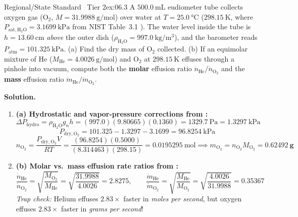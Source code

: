 \begin{workedexample}{Regional/State Standard \textbar\ Tier 2}{ex:06.3}
A $\SI{500.0}{\milli\liter}$ eudiometer tube collects oxygen gas ($\mathrm{O_2}$, $M = \SI{31.9988}{\gram\per\mole}$) over water at $T = \SI{25.0}{\celsius}$ ($\SI{298.15}{\kelvin}$, where $P_{\mathrm{sat,H_2O}} = \SI{3.1699}{\kilo\pascal}$ from NIST Table~3.1 ). The water level inside the tube is $h = \SI{13.60}{\centi\meter}$ \emph{above} the outer dish ($\rho_{\mathrm{H_2O}} = \SI{997.0}{\kilogram\per\cubic\meter}$), and the barometer reads $P_{\mathrm{atm}} = \SI{101.325}{\kilo\pascal}$. (a) Find the dry mass of $\mathrm{O_2}$ collected. (b) If an equimolar mixture of $\mathrm{He}$ ($M_{\mathrm{He}} = \SI{4.0026}{\gram\per\mole}$) and $\mathrm{O_2}$ at $\SI{298.15}{\kelvin}$ effuses through a pinhole into vacuum, compute both the \textbf{molar} effusion ratio $\dot{n}_{\mathrm{He}}/\dot{n}_{\mathrm{O_2}}$ and the \textbf{mass} effusion ratio $\dot{m}_{\mathrm{He}}/\dot{m}_{\mathrm{O_2}}$.
\par\smallskip\noindent
\textbf{Solution.}
\begin{enumerate}
  \item \textbf{(a) Hydrostatic and vapor-pressure corrections from :}
  \[
    \Delta P_{\mathrm{hydro}} = \rho_{\mathrm{H_2O}}g_n h = (997.0)(9.80665)(0.1360) = \SI{1329.7}{\pascal} = \SI{1.3297}{\kilo\pascal}
  \]
  \[
    P_{\mathrm{dry,O_2}} = 101.325 - 1.3297 - 3.1699 = \SI{96.8254}{\kilo\pascal}
  \]
  \[
    n_{\mathrm{O_2}} = \frac{P_{\mathrm{dry,O_2}}V}{RT} = \frac{(96.8254)(0.5000)}{(8.314463)(298.15)} = \SI{0.0195295}{\mole} \implies m_{\mathrm{O_2}} = n_{\mathrm{O_2}}M_{\mathrm{O_2}} = \mathbf{\SI{0.62492}{\gram}}
  \]
  \item \textbf{(b) Molar vs.\ mass effusion rate ratios from :}
  \[
    \frac{\dot{n}_{\mathrm{He}}}{\dot{n}_{\mathrm{O_2}}} = \sqrt{\frac{M_{\mathrm{O_2}}}{M_{\mathrm{He}}}} = \sqrt{\frac{31.9988}{4.0026}} = \mathbf{2.8275}, \qquad \frac{\dot{m}_{\mathrm{He}}}{\dot{m}_{\mathrm{O_2}}} = \sqrt{\frac{M_{\mathrm{He}}}{M_{\mathrm{O_2}}}} = \sqrt{\frac{4.0026}{31.9988}} = \mathbf{0.35367}
  \]
  \emph{Trap check:} Helium effuses $2.83\times$ faster in \emph{moles per second}, but oxygen effuses $2.83\times$ faster in \emph{grams per second}!
\end{enumerate}
\end{workedexample}

